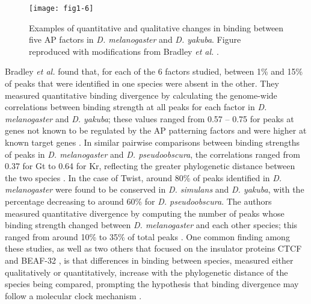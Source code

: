 \begin{figure}
\centering
\texttt{[image: fig1-6]}
\caption{Examples of quantitative and qualitative changes in binding between five AP factors in \emph{D. melanogaster} and \emph{D. yakuba}. Figure reproduced with modifications from Bradley \emph{et al.} \citet{bradley_binding_2010}.}
\label{Figure 1.6}
\end{figure}

Bradley \emph{et al.} found that, for each of the 6 factors studied, between 1\% and 15\% of peaks that were identified in one species were absent in the other. They measured quantitative binding divergence by calculating the genome-wide correlations between binding strength at all peaks for each factor in \emph{D. melanogaster} and \emph{D. yakuba}; these values ranged from 0.57 – 0.75 for peaks at genes not known to be regulated by the AP patterning factors and were higher at known target genes \citep{bradley_binding_2010}. In similar pairwise comparisons between binding strengths of peaks in \emph{D. melanogaster} and \emph{D. pseudoobscura}, the correlations ranged from 0.37 for Gt to 0.64 for Kr, reflecting the greater phylogenetic distance between the two species \citep{paris_extensive_2013}. In the case of Twist, around 80\% of peaks identified in \emph{D. melanogaster} were found to be conserved in \emph{D. simulans} and \emph{D. yakuba}, with the percentage decreasing to around 60\% for \emph{D. pseudoobscura}. The authors measured quantitative divergence by computing the number of peaks whose binding strength changed between \emph{D. melanogaster} and each other species; this ranged from around 10\% to 35\% of total peaks \citep{he_high_2011}. One common finding among these studies, as well as two others that focused on the insulator proteins CTCF and BEAF-32 \citep{ni_adaptive_2012,yang_beaf-32_2012}, is that differences in binding between species, measured either qualitatively or quantitatively, increase with the phylogenetic distance of the species being compared, prompting the hypothesis that binding divergence may follow a molecular clock mechanism \citep{he_high_2011}.\\

